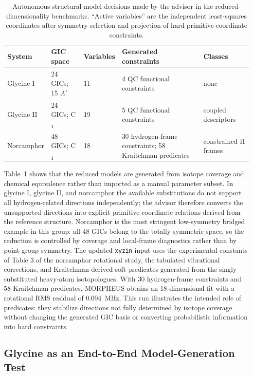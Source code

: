 \documentclass[aip,jcp,reprint,longbibliography,floatfix]{revtex4-2}
\begin{document}
\begin{table}
\caption{Autonomous structural-model decisions made by the advisor in the
reduced-dimensionality benchmarks. ``Active variables'' are the
independent least-squares coordinates after symmetry selection and projection
of hard primitive-coordinate constraints.}
\label{tab:advisor-decisions}
\footnotesize
\setlength{\tabcolsep}{4pt}
\begin{tabular}{@{}lllll@{}}
\toprule
System & GIC space & Variables & Generated constraints & Classes \\
\midrule
Glycine I & 24 GICs; 15 $A'$ & 11 & 4 QC functional constraints & none \\
Glycine II & 24 GICs; C$_1$ & 19 & 5 QC functional constraints & coupled descriptors \\
Norcamphor & 48 GICs; C$_1$ & 18 & 30 hydrogen-frame constraints; 58 Kraitchman predicates & constrained H frames \\
\bottomrule
\end{tabular}
\end{table}

Table~\ref{tab:advisor-decisions} shows that the reduced models are generated
from isotope coverage and chemical equivalence rather than imported as a
manual parameter subset. In glycine I, glycine II, and norcamphor the available
substitutions do not support all hydrogen-related directions independently;
the advisor therefore converts the unsupported directions into explicit
primitive-coordinate relations derived from the reference structure. Norcamphor
is the most stringent low-symmetry bridged example in this group: all 48 GICs
belong to the totally symmetric space, so the reduction is controlled by
coverage and local-frame diagnostics rather than by point-group symmetry. The
updated \texttt{xyzin} input uses the experimental constants of Table 3 of the
norcamphor rotational study, the tabulated vibrational corrections, and
Kraitchman-derived soft predicates generated from the singly substituted
heavy-atom isotopologues. With 30 hydrogen-frame constraints and 58
Kraitchman predicates, MORPHEUS obtains an 18-dimensional fit with a rotational
RMS residual of 0.094~MHz. This run illustrates the intended role of
predicates: they stabilize directions not fully determined by isotope coverage
without changing the generated GIC basis or converting probabilistic
information into hard constraints.

\subsection{Glycine as an End-to-End Model-Generation Test}
\end{document}
